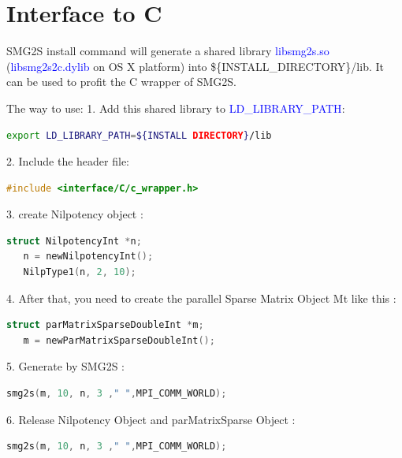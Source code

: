 \documentclass[a4paper, 10 pt]{report}
\begin{document}
	\section{Interface to C}
	SMG2S install command will generate a shared library \textcolor{blue}{libsmg2s.so} (\textcolor{blue}{libsmg2s2c.dylib} on OS X platform) into \$\{INSTALL\_DIRECTORY\}/lib. It can be used to profit the C wrapper of SMG2S. 
	
	The way to use:
	1. Add this shared library to \textcolor{blue}{LD\_LIBRARY\_PATH}:
	
	\begin{lstlisting}[language=bash,frame=single]
   export LD_LIBRARY_PATH=${INSTALL DIRECTORY}/lib
	\end{lstlisting}

	2. Include the header file:
	\begin{lstlisting}[language=C,frame=single]
  #include <interface/C/c_wrapper.h>
	\end{lstlisting}
	
	3. create Nilpotency object :
	
	\begin{lstlisting}[language=C,frame=single]
   struct NilpotencyInt *n;
   n = newNilpotencyInt();
   NilpType1(n, 2, 10);
	\end{lstlisting}
	
	4. After that, you need to create the parallel Sparse Matrix Object Mt like this :

	\begin{lstlisting}[language=C,frame=single]
   struct parMatrixSparseDoubleInt *m;
   m = newParMatrixSparseDoubleInt();
	\end{lstlisting}

	5. Generate by SMG2S :
	
	\begin{lstlisting}[language=C,frame=single]
   smg2s(m, 10, n, 3 ," ",MPI_COMM_WORLD);
    \end{lstlisting}

   6. Release Nilpotency Object and parMatrixSparse Object :
	\begin{lstlisting}[language=C,frame=single]
   smg2s(m, 10, n, 3 ," ",MPI_COMM_WORLD);
   \end{lstlisting}
\end{document}
